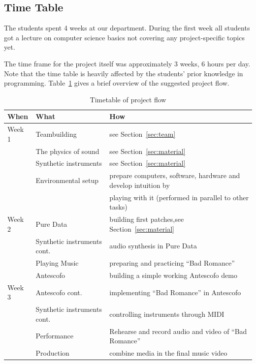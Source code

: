 \documentclass[onecolumn,nocopyrightspace,preprint]{sigplanconf}
\begin{document}
\subsection{Time Table}

The students spent 4 weeks at our department. During the first week all students
got a lecture on computer science basics not covering any project-specific topics yet.

The time frame for the project itself was approximately 3 weeks, 6 hours per day.
Note that the time table is heavily affected by the students' prior
knowledge in programming. Table~\ref{tab:time} gives a brief overview of the
suggested project flow.

\begin{table}
\centering
\begin{tabular}{l|ll}
When              & What  & How  \\
\hline
Week 1            & Teambuilding          & see Section~\ref{sec:team} \\
                  & The physics of sound  & see Section~\ref{sec:material} \\
                  & Synthetic instruments & see Section~\ref{sec:material} \\
                  & Environmental setup   & prepare computers, software, hardware and develop intuition by 
                  \\
                  &  & playing with it (performed in parallel to other tasks)  \\
Week 2            & Pure Data             & building first patches,see Section~\ref{sec:material} \\
                  & Synthetic instruments cont. & audio synthesis in Pure Data \\
                  & Playing Music   & preparing and practicing ``Bad Romance'' \\
                  & Antescofo & building a simple working Antescofo demo \\
Week 3            & Antescofo cont. & implementing ``Bad Romance'' in Antescofo \\
                  & Synthetic instruments cont.  & controlling instruments through MIDI \\
                  & Performance   & Rehearse and record audio and video of ``Bad Romance'' \\
                  & Production   & combine media in the final music video \\
\end{tabular}
\caption{Timetable of project flow}
\label{tab:time}
\end{table}
\end{document}
